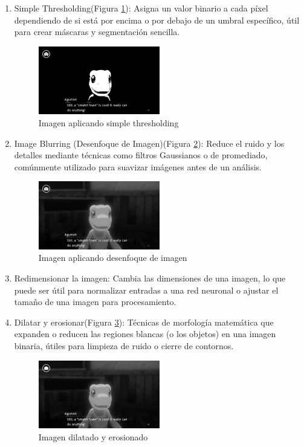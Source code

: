 \begin{enumerate}
	\item Simple Thresholding(Figura \ref{fig:S.Threshold}): 
	Asigna un valor binario a cada píxel dependiendo de si está por encima o por debajo de un umbral específico, útil para crear máscaras y segmentación sencilla.
	\begin{figure}[H]
		\centering
		\includegraphics[width = 0.5\textwidth]{Imagenes/Preprocesado/7.png}
		\caption{Imagen aplicando simple thresholding}
		\label{fig:S.Threshold}
	\end{figure}
	
	\item Image Blurring (Desenfoque de Imagen)(Figura \ref{fig:Blurring}): 
	Reduce el ruido y los detalles mediante técnicas como filtros Gaussianos o de promediado, comúnmente utilizado para suavizar imágenes antes de un análisis.
	\begin{figure}[H]
		\centering
		\includegraphics[width = 0.5\textwidth]{Imagenes/Preprocesado/8.png}
		\caption{Imagen aplicando desenfoque de imagen}
		\label{fig:Blurring}
	\end{figure}
	
	\item Redimensionar la imagen: 
	Cambia las dimensiones de una imagen, lo que puede ser útil para normalizar entradas a una red neuronal o ajustar el tamaño de una imagen para procesamiento.
	
	\item Dilatar y erosionar(Figura \ref{fig:Dilate_Erode}): 
	Técnicas de morfología matemática que expanden o reducen las regiones blancas (o los objetos) en una imagen binaria, útiles para limpieza de ruido o cierre de contornos.
	\begin{figure}[H]
		\centering
		\includegraphics[width = 0.5\textwidth]{Imagenes/Preprocesado/10.png}
		\caption{Imagen dilatado y erosionado}
		\label{fig:Dilate_Erode}
	\end{figure}
	

\end{enumerate}
